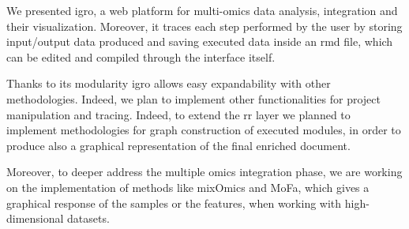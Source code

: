 We presented \gls{igro}, a web platform for multi-omics data analysis, integration and their visualization.
Moreover, it traces each step performed by the user by storing input/output data produced and saving executed data inside an \gls{rmd} file, which can be edited and compiled through the interface itself.

Thanks to its modularity \gls{igro} allows easy expandability with other methodologies.
Indeed, we plan to implement other functionalities for project manipulation and tracing. 
Indeed, to extend the \gls{rr} layer we planned to implement methodologies for graph construction of executed modules, in order to produce also a graphical representation of the final enriched document.

Moreover, to deeper address the multiple omics integration phase, we are working on the implementation of methods like mixOmics and MoFa, which gives a graphical response of the samples or the features, when working with high-dimensional datasets.